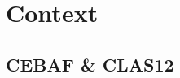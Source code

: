 \section{Context}
\begin{frame}{}
    \centering \Huge{}
\end{frame}

\subsection{CEBAF \& CLAS12}

